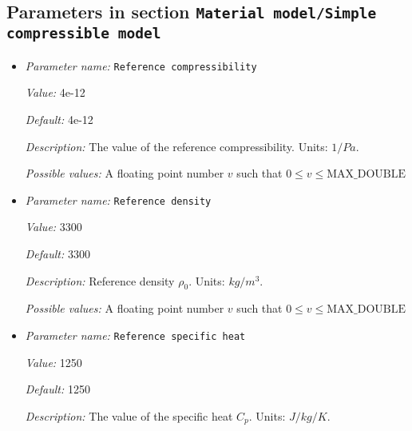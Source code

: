 \subsection{Parameters in section \tt Material model/Simple compressible model}
\label{parameters:Material_20model/Simple_20compressible_20model}

\begin{itemize}
\item {\it Parameter name:} {\tt Reference compressibility}
\label{parameters:Material model/Simple compressible model/Reference compressibility}
\label{parameters:Material_20model/Simple_20compressible_20model/Reference_20compressibility}


{\it Value:} 4e-12


{\it Default:} 4e-12


{\it Description:} The value of the reference compressibility. Units: $1/Pa$.


{\it Possible values:} A floating point number $v$ such that $0 \leq v \leq \text{MAX\_DOUBLE}$
\item {\it Parameter name:} {\tt Reference density}
\label{parameters:Material model/Simple compressible model/Reference density}
\label{parameters:Material_20model/Simple_20compressible_20model/Reference_20density}


{\it Value:} 3300


{\it Default:} 3300


{\it Description:} Reference density $\rho_0$. Units: $kg/m^3$.


{\it Possible values:} A floating point number $v$ such that $0 \leq v \leq \text{MAX\_DOUBLE}$
\item {\it Parameter name:} {\tt Reference specific heat}
\label{parameters:Material model/Simple compressible model/Reference specific heat}
\label{parameters:Material_20model/Simple_20compressible_20model/Reference_20specific_20heat}


{\it Value:} 1250


{\it Default:} 1250


{\it Description:} The value of the specific heat $C_p$. Units: $J/kg/K$.



\end{itemize}
